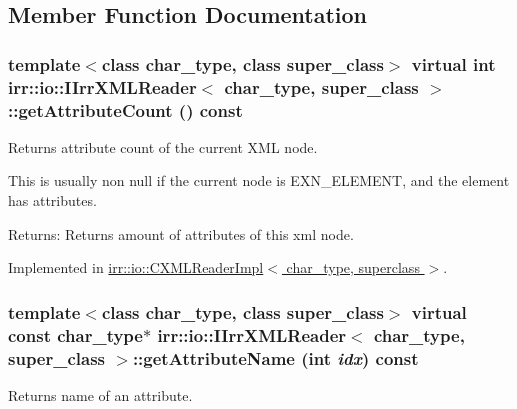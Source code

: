 \subsection{Member Function Documentation}
\hypertarget{classirr_1_1io_1_1_i_irr_x_m_l_reader_eaa1cfc860be7b788f78edec403cc2a2}{
\subsubsection[{getAttributeCount}]{\setlength{\rightskip}{0pt plus 5cm}template$<$class char\_\-type, class super\_\-class$>$ virtual int {\bf irr::io::IIrrXMLReader}$<$ char\_\-type, super\_\-class $>$::getAttributeCount () const}}
\label{classirr_1_1io_1_1_i_irr_x_m_l_reader_eaa1cfc860be7b788f78edec403cc2a2}


Returns attribute count of the current XML node. 

This is usually non null if the current node is EXN\_\-ELEMENT, and the element has attributes. \begin{Desc}
\item[Returns:]Returns amount of attributes of this xml node. \end{Desc}


Implemented in \hyperlink{classirr_1_1io_1_1_c_x_m_l_reader_impl_0e8003aa93f362dd118c735d8a98e8d5}{irr::io::CXMLReaderImpl$<$ char\_\-type, superclass $>$}.\hypertarget{classirr_1_1io_1_1_i_irr_x_m_l_reader_a0807dc565c67fcf355e656df1a326ef}{
\subsubsection[{getAttributeName}]{\setlength{\rightskip}{0pt plus 5cm}template$<$class char\_\-type, class super\_\-class$>$ virtual const char\_\-type$\ast$ {\bf irr::io::IIrrXMLReader}$<$ char\_\-type, super\_\-class $>$::getAttributeName (int {\em idx}) const}}
\label{classirr_1_1io_1_1_i_irr_x_m_l_reader_a0807dc565c67fcf355e656df1a326ef}


Returns name of an attribute. 

